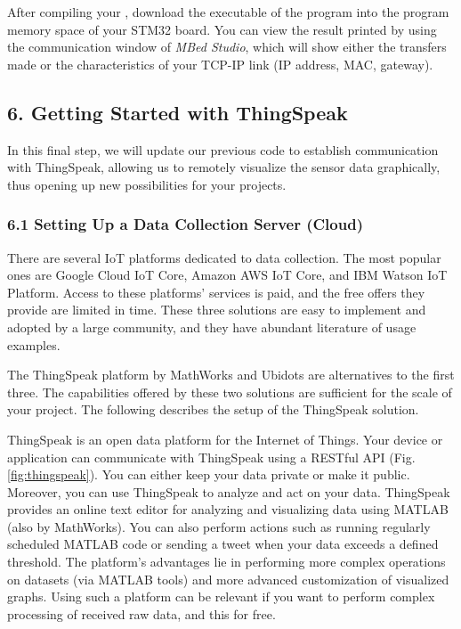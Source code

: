 \documentclass[10pt,a4paper,onecolumn]{article}
\let\textttOrig=\texttt
\def\texttt#1{\expandafter\textttOrig{\seqsplit{#1}}}
\begin{document}
After compiling your \texttt{main.cpp}, download the executable of the
program into the program memory space of your STM32 board. You can view
the result printed by \texttt{printf} using the communication window of
\textit{MBed Studio}, which will show either the transfers made or the
characteristics of your TCP-IP link (IP address, MAC, gateway).

\hypertarget{getting-started-with-thingspeak}{%
\subsection{6. Getting Started with
ThingSpeak}\label{getting-started-with-thingspeak}}

In this final step, we will update our previous code to establish
communication with ThingSpeak, allowing us to remotely visualize the
sensor data graphically, thus opening up new possibilities for your
projects.

\hypertarget{setting-up-a-data-collection-server-cloud}{%
\subsubsection{6.1 Setting Up a Data Collection Server
(Cloud)}\label{setting-up-a-data-collection-server-cloud}}

There are several IoT platforms dedicated to data collection. The most
popular ones are Google Cloud IoT Core, Amazon AWS IoT Core, and IBM
Watson IoT Platform. Access to these platforms' services is paid, and
the free offers they provide are limited in time. These three solutions
are easy to implement and adopted by a large community, and they have
abundant literature of usage examples.

The ThingSpeak platform by MathWorks and Ubidots are alternatives to the
first three. The capabilities offered by these two solutions are
sufficient for the scale of your project. The following describes the
setup of the ThingSpeak solution.

ThingSpeak is an open data platform for the Internet of Things. Your
device or application can communicate with ThingSpeak using a RESTful
API (Fig. \ref{fig:thingspeak}). You can either keep your data private or make it
public. Moreover, you can use ThingSpeak to analyze and act on your
data. ThingSpeak provides an online text editor for analyzing and
visualizing data using MATLAB (also by MathWorks). You can also perform
actions such as running regularly scheduled MATLAB code or sending a
tweet when your data exceeds a defined threshold. The platform's
advantages lie in performing more complex operations on datasets (via
MATLAB tools) and more advanced customization of visualized graphs.
Using such a platform can be relevant if you want to perform complex
processing of received raw data, and this for free.
\end{document}
